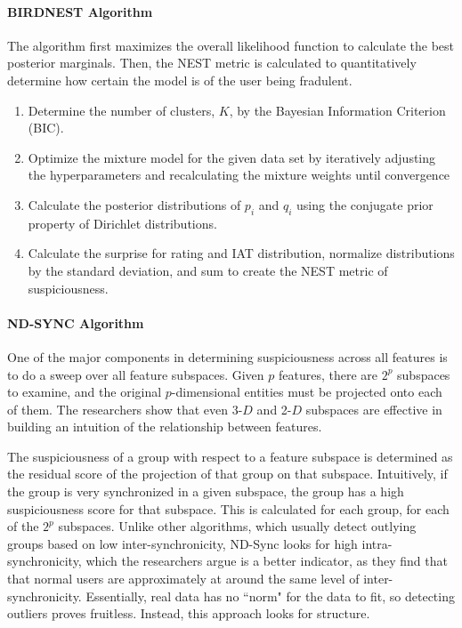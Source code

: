 \documentclass[11pt, oneside]{article}   	%
\begin{document}
\paragraph*{BIRDNEST Algorithm}
\quad

\quad The algorithm \cite{birdnest} first maximizes the overall likelihood function to calculate the best posterior marginals.
Then, the NEST metric is calculated to quantitatively determine how certain the model is of the user being fradulent.
\begin{enumerate}
	\item Determine the number of clusters, $K$, by the Bayesian Information Criterion (BIC).
	\item Optimize the mixture model for the given data set by iteratively adjusting the hyperparameters and recalculating the mixture weights until convergence
	\item Calculate the posterior distributions of $p_i$ and $q_i$ using the conjugate prior property of Dirichlet distributions.
	\item Calculate the surprise for rating and IAT distribution, normalize distributions by the standard deviation, and sum to create the NEST metric of suspiciousness. 
\end{enumerate}

\paragraph*{ND-SYNC Algorithm}
\quad

\quad One of the major components in determining suspiciousness across all features is to do a sweep over all feature subspaces.
Given $p$ features, there are $2^p$ subspaces to examine, and the original $p$-dimensional entities must be projected onto each of them.
The researchers show that even 3-$D$ and 2-$D$ subspaces are effective in building an intuition of the relationship between features.

\quad The suspiciousness of a group with respect to a feature subspace is determined as the residual score of the projection of that group on that subspace.
Intuitively, if the group is very synchronized in a given subspace, the group has a high suspiciousness score for that subspace.
This is calculated for each group, for each of the $2^p$ subspaces.
Unlike other algorithms, which usually detect outlying groups based on low inter-synchronicity, ND-Sync \cite{ndsync} looks for high intra-synchronicity, which the researchers argue is a better indicator, as they find that that normal users are approximately at around the same level of inter-synchronicity.
Essentially, real data has no ``norm" for the data to fit, so detecting outliers proves fruitless.
Instead, this approach looks for structure.
\end{document}
